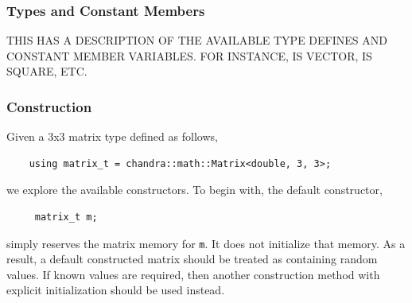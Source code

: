 \documentclass[10pt,letterpaper]{memoir} %
\begin{document}
\subsubsection{Types and Constant Members}
THIS HAS A DESCRIPTION OF THE AVAILABLE TYPE DEFINES AND CONSTANT MEMBER VARIABLES. FOR INSTANCE, IS VECTOR, IS SQUARE, ETC.
 
\subsubsection{Construction}
Given a 3x3 matrix type defined as follows,
\begin{verbatim}
	using matrix_t = chandra::math::Matrix<double, 3, 3>;	
\end{verbatim}
we explore the available constructors.  To begin with, the default constructor,
\begin{verbatim}
	 matrix_t m;	
\end{verbatim}
simply reserves the matrix memory for \texttt{m}.  It does not initialize that memory.  As a result, a default constructed matrix should be treated as containing random values.  If known values are required, then another construction method with explicit initialization should be used instead.   
\end{document}
